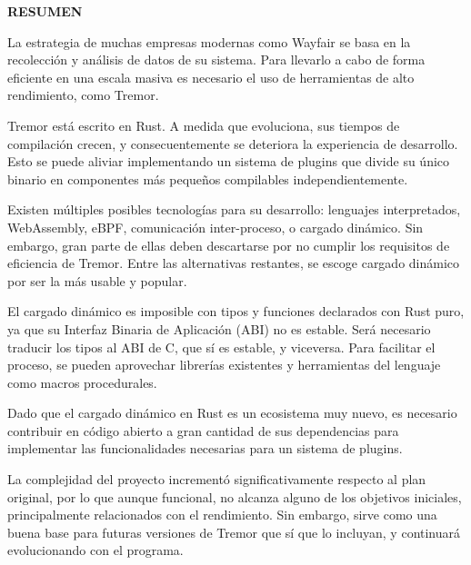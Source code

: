 
\begin{center}
{\LARGE \bfseries RESUMEN}

\vspace{2.5cm}
\end{center}

La estrategia de muchas empresas modernas como Wayfair se basa en la recolección
y análisis de datos de su sistema. Para llevarlo a cabo de forma eficiente en
una escala masiva es necesario el uso de herramientas de alto rendimiento, como
Tremor.

Tremor está escrito en Rust. A medida que evoluciona, sus tiempos de compilación
crecen, y consecuentemente se deteriora la experiencia de desarrollo. Esto se
puede aliviar implementando un sistema de plugins que divide su único binario en
componentes más pequeños compilables independientemente.

Existen múltiples posibles tecnologías para su desarrollo: lenguajes
interpretados, WebAssembly, eBPF, comunicación inter-proceso, o cargado
dinámico. Sin embargo, gran parte de ellas deben descartarse por no cumplir los
requisitos de eficiencia de Tremor. Entre las alternativas restantes, se escoge
cargado dinámico por ser la más usable y popular.

El cargado dinámico es imposible con tipos y funciones declarados con Rust puro,
ya que su Interfaz Binaria de Aplicación (ABI) no es estable. Será necesario
traducir los tipos al ABI de C, que sí es estable, y viceversa. Para facilitar
el proceso, se pueden aprovechar librerías existentes y herramientas del
lenguaje como macros procedurales.

Dado que el cargado dinámico en Rust es un ecosistema muy nuevo, es necesario
contribuir en código abierto a gran cantidad de sus dependencias para
implementar las funcionalidades necesarias para un sistema de plugins.

La complejidad del proyecto incrementó significativamente respecto al plan
original, por lo que aunque funcional, no alcanza alguno de los objetivos
iniciales, principalmente relacionados con el rendimiento. Sin embargo, sirve
como una buena base para futuras versiones de Tremor que sí que lo incluyan,
y continuará evolucionando con el programa.
